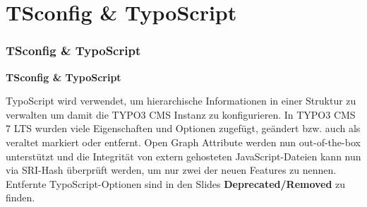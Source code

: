 %

\section{TSconfig \& TypoScript}
\begin{frame}[fragile]
	\frametitle{TSconfig \& TypoScript}

	\begin{center}\huge{\color{typo3darkgrey}\textbf{TSconfig \& TypoScript}}\end{center}

	TypoScript wird verwendet, um hierarchische Informationen in einer Struktur zu
	verwalten um damit die TYPO3 CMS Instanz zu konfigurieren. In TYPO3 CMS 7 LTS wurden
	viele Eigenschaften und Optionen zugefügt, geändert bzw. auch als veraltet markiert
	oder entfernt.\newline
	Open Graph Attribute werden nun out-of-the-box unterstützt und die Integrität von
	extern gehosteten JavaScript-Dateien kann nun via SRI-Hash überprüft werden, um nur
	zwei der neuen Features zu nennen.\newline
	Entfernte TypoScript-Optionen sind in den Slides \textbf{Deprecated/Removed} zu
	finden.

\end{frame}

